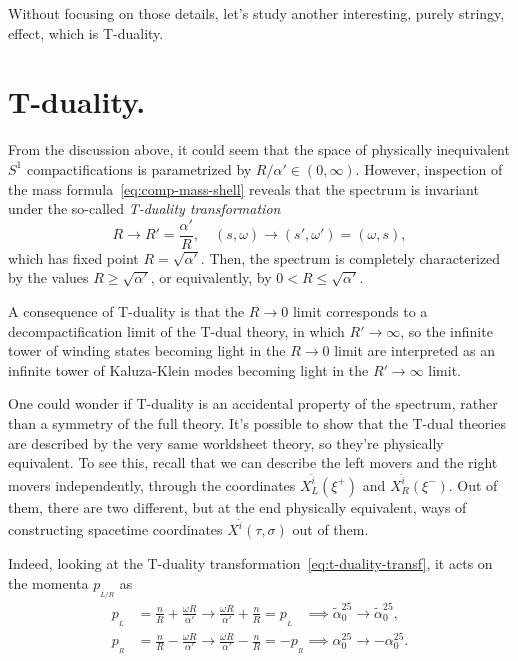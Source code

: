 Without focusing on those details, let's study another interesting, purely stringy, effect, which is T-duality.

\section{T-duality.}\label{sec:t-duality}
From the discussion above, it could seem that the space of physically inequivalent $S^1$ compactifications is parametrized by $R/\alpha' \in (0,\infty)$. However, inspection of the mass formula~\eqref{eq:comp-mass-shell} reveals that the spectrum is invariant under the so-called \emph{T-duality transformation}
\begin{equation}\label{eq:t-duality-transf}
    R \to R' = \frac{\alpha'}{R}, \quad (s,\omega) \to (s',\omega') = (\omega, s) ,
\end{equation}
which has fixed point $R = \sqrt{\alpha'}$. Then, the spectrum is completely characterized by the values $R \geq \sqrt{\alpha'}$, or equivalently, by $0 < R \leq \sqrt{\alpha'}$.

A consequence of T-duality is that the $R \to 0$ limit corresponds to a decompactification limit of the T-dual theory, in which $R' \to \infty$, so the infinite tower of winding states becoming light in the $R \to 0$ limit are interpreted as an infinite tower of Kaluza-Klein modes becoming light in the $R' \to \infty$ limit.


One could wonder if T-duality is an accidental property of the spectrum, rather than a symmetry of the full theory. It's possible to show that the T-dual theories are described by the very same worldsheet theory, so they're physically equivalent. To see this, recall that we can describe the left movers and the right movers independently, through the coordinates $X^{\hat{i}}_L(\xi^+)$ and $X^{\hat{i}}_R(\xi^-)$. Out of them, there are two different, but at the end physically equivalent, ways of constructing spacetime coordinates $X^{\hat{i}}(\tau,\sigma)$ out of them. 

Indeed, looking at the T-duality transformation~\eqref{eq:t-duality-transf}, it acts on the momenta $p_{\!_{L/R}}$ as
\begin{equation}\label{eq:t-duality-momenta}
\begin{aligned}
    p_{\!_L} &= \frac{n}{R} + \frac{\omega R}{\alpha'} \to \frac{\omega R}{\alpha'} + \frac{n}{R} = p_{\!_L} \; \; \; \implies \tilde{\alpha}^{25}_0 \to \tilde{\alpha}^{25}_0 ,\\
    p_{\!_R} &= \frac{n}{R} - \frac{\omega R}{\alpha'} \to \frac{\omega R}{\alpha'} - \frac{n}{R} = - p_{\!_R} \implies {\alpha}^{25}_0 \to -{\alpha}^{25}_0 .
\end{aligned}
\end{equation}

